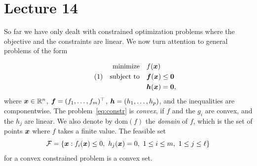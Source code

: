 %
%
% 


\chapter*{Lecture 14}
\setcounter{chapter}{14}
\setcounter{section}{0}
\setcounter{equation}{0}
\setcounter{theorem}{0}


So far we have only dealt with constrained optimization problems where the objective and the constraints are linear. We now turn attention to general problems of the form

\begin{align*}\label{eq:constr}\tag{1}
\begin{split}
 \text{minimize}\quad & f(\bm{x})\\
 \quad\text{subject to}\quad & \bm{f}(\bm{x})\leq \bm{0}\\
         & \bm{h}(\bm{x})= \bm{0},
\end{split}
\end{align*}
where $\bm{x}\in \mathbb{R}^n$, $\bm{f}=(f_1,\dots,f_m)^{\top}$, $\bm{h}=(h_1,\dots,h_{p})$, and the inequalities are componentwise. 
The problem~\eqref{eq:constr} is {\em convex}, if $f$ and the $g_i$ are convex, and the $h_j$ are linear. We also denote by $\mathrm{dom}(f)$ the {\em domain} of $f$, which is the set of points $\bm{x}$ where $f$ takes a finite value. The feasible set
\begin{equation*}
 \mathcal{F} = \{\bm{x} \mathrel{\mathop{:}} f_i(\bm{x})\leq 0, \ h_j(\bm{x})=0, \ 1\leq i\leq m, \ 1\leq j\leq \ell\}
\end{equation*}
for a convex constrained problem is a convex set.

